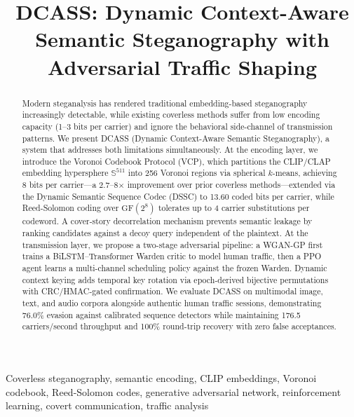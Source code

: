 \documentclass[conference]{IEEEtran}
\begin{document}
\title{DCASS: Dynamic Context-Aware Semantic Steganography with Adversarial Traffic Shaping}

\author{
}

\maketitle

\begin{abstract}
Modern steganalysis has rendered traditional embedding-based steganography increasingly detectable, while existing coverless methods suffer from low encoding capacity (1--3 bits per carrier) and ignore the behavioral side-channel of transmission patterns. We present DCASS (Dynamic Context-Aware Semantic Steganography), a system that addresses both limitations simultaneously. At the encoding layer, we introduce the Voronoi Codebook Protocol (VCP), which partitions the CLIP/CLAP embedding hypersphere $\mathbb{S}^{511}$ into 256 Voronoi regions via spherical $k$-means, achieving 8 bits per carrier---a 2.7--8$\times$ improvement over prior coverless methods---extended via the Dynamic Semantic Sequence Codec (DSSC) to 13.60 coded bits per carrier, while Reed-Solomon coding over $\text{GF}(2^8)$ tolerates up to 4 carrier substitutions per codeword. A cover-story decorrelation mechanism prevents semantic leakage by ranking candidates against a decoy query independent of the plaintext. At the transmission layer, we propose a two-stage adversarial pipeline: a WGAN-GP first trains a BiLSTM--Transformer Warden critic to model human traffic, then a PPO agent learns a multi-channel scheduling policy against the frozen Warden. Dynamic context keying adds temporal key rotation via epoch-derived bijective permutations with CRC/HMAC-gated confirmation. We evaluate DCASS on multimodal image, text, and audio corpora alongside authentic human traffic sessions, demonstrating 76.0\% evasion against calibrated sequence detectors while maintaining 176.5 carriers/second throughput and 100\% round-trip recovery with zero false acceptances.
\end{abstract}

\begin{IEEEkeywords}
Coverless steganography, semantic encoding, CLIP embeddings, Voronoi codebook, Reed-Solomon codes, generative adversarial network, reinforcement learning, covert communication, traffic analysis
\end{IEEEkeywords}
\end{document}

